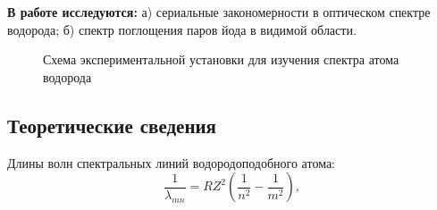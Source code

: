\documentclass[12pt]{report}
\begin{document}
\section*{}
\section*{}
\textbf{В работе исследуются:} а) сериальные закономерности в оптическом спектре водорода; б) спектр поглощения паров йода в видимой области.

\begin{figure}[h]
    \centering
    \begin{floatrow}
        {\caption{Схема экспериментальной установки для изучения спектра атома водорода}}
    \end{floatrow}
\end{figure}


\subsection*{Теоретические сведения}

Длины волн спектральных линий водородоподобного атома:
\begin{equation}
\label{e1}
\frac{1}{\lambda_{mn}} = RZ^2\left( \frac{1}{n^2} - \frac{1}{m^2} \right),
\end{equation}
\end{document}
